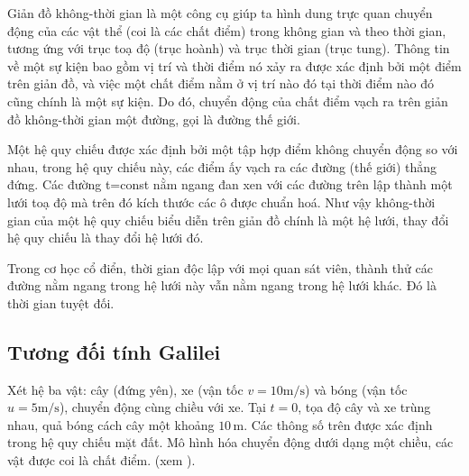 
Giản đồ không-thời gian là một công cụ giúp ta hình dung trực quan chuyển động của các vật thể (coi là các chất điểm) trong không gian và theo thời gian, tương ứng với trục toạ độ (trục hoành) và trục thời gian (trục tung). Thông tin về một sự kiện bao gồm vị trí và thời điểm nó xảy ra được xác định bởi một điểm trên giản đồ, và việc một chất điểm nằm ở vị trí nào đó tại thời điểm nào đó cũng chính là một sự kiện. Do đó, chuyển động của chất điểm vạch ra trên giản đồ không-thời gian một đường, gọi là đường thế giới.
\vspace{8pt}

Một hệ quy chiếu được xác định bởi một tập hợp điểm không chuyển động so với nhau, trong hệ quy chiếu này, các điểm ấy vạch ra các đường (thế giới) thẳng đứng. Các đường t=const nằm ngang đan xen với các đường trên lập thành một lưới toạ độ mà trên đó kích thước các ô được chuẩn hoá. Như vậy không-thời gian của một hệ quy chiếu biểu diễn trên giản đồ chính là một hệ lưới, thay đổi hệ quy chiếu là thay đổi hệ lưới đó. 
\vspace{8pt}

Trong cơ học cổ điển, thời gian độc lập với mọi quan sát viên, thành thử các đường nằm ngang trong hệ lưới này vẫn nằm ngang trong hệ lưới khác. Đó là thời gian tuyệt đối. 

\subsection*{Tương đối tính Galilei}
Xét hệ ba vật: cây (đứng yên), xe (vận tốc $v=10 \mathrm{m/s}$) và bóng (vận tốc $u=5 \mathrm{m/s}$), chuyển động cùng chiều với xe. Tại $t=0$, tọa độ cây và xe trùng nhau, quả bóng cách cây một khoảng $10\,\mathrm{m}$. Các thông số trên được xác định trong hệ quy chiếu mặt đất. Mô hình hóa chuyển động dưới dạng một chiều, các vật được coi là chất điểm. (xem ).
\vspace{8pt}



